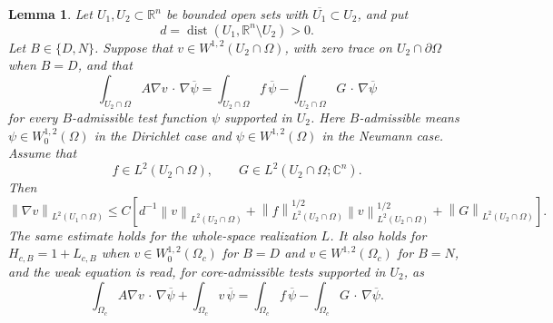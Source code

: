 \documentclass[12pt]{amsart}
\newcommand\R{\mathbb{R}}
\newcommand{\cdo}{\, \cdot \,}
\newcommand{\dist}{\operatorname{dist}}
\newcommand{\norm}[2]{\left\lVert #1\right\rVert_{#2}}
\newtheorem{lemma}[theorem]{Lemma}
\theoremstyle{remark}
\begin{document}
\begin{lemma}\label{lem:local-caccioppoli}
Let $U_1,U_2\subset\R^n$ be bounded open sets with
$\overline{U_1}\subset U_2$, and put
\[
 d=\dist(U_1,\R^n\setminus U_2)>0.
\]
Let $B\in\{D,N\}$.  Suppose that
$v\in W^{1,2}(U_2\cap\Omega)$, with zero trace on
$U_2\cap\partial\Omega$ when $B=D$, and that
\[
 \int_{U_2\cap\Omega}A\nabla v\mathbin{\cdo}\nabla\overline\psi
 =\int_{U_2\cap\Omega}f\,\overline\psi
  -\int_{U_2\cap\Omega}G\mathbin{\cdo}\nabla\overline\psi
\]
for every $B$-admissible test function $\psi$ supported in $U_2$.
Here $B$-admissible means $\psi\in W_0^{1,2}(\Omega)$ in the Dirichlet
case and $\psi\in W^{1,2}(\Omega)$ in the Neumann case.  Assume that
\[
 f\in L^2(U_2\cap\Omega),
 \qquad G\in L^2(U_2\cap\Omega;\mathbb C^n).
\]
Then
\begin{equation}\label{eq:local-caccioppoli}
 \norm{\nabla v}{L^2(U_1\cap\Omega)}
 \leq C\left[
 d^{-1}\norm v{L^2(U_2\cap\Omega)}
 +\norm f{L^2(U_2\cap\Omega)}^{1/2}
  \norm v{L^2(U_2\cap\Omega)}^{1/2}
 +\norm G{L^2(U_2\cap\Omega)}
 \right].
\end{equation}
The same estimate holds for the whole-space realization $L$.  It also
holds for $H_{c,B}=1+L_{c,B}$ when $v\in W_0^{1,2}(\Omega_c)$ for $B=D$
and $v\in W^{1,2}(\Omega_c)$ for $B=N$, and the weak
equation is read, for core-admissible tests supported in $U_2$, as
\[
 \int_{\Omega_c}A\nabla v\mathbin{\cdo}\nabla\overline\psi
 +\int_{\Omega_c}v\,\overline\psi
 =\int_{\Omega_c}f\,\overline\psi
 -\int_{\Omega_c}G\mathbin{\cdo}\nabla\overline\psi.
\]
\end{lemma}
\end{document}
